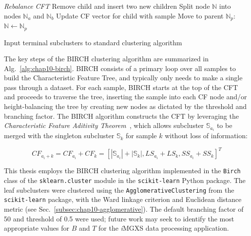 \begin{algorithm}[h!]
\begin{algorithmic}[1]
    \item[]

    \Statex \hspace{0.2in} \textit{Rebalance CFT}
        \State Remove child and insert two new children
          \State Split node $\mathbb{N}$ into nodes $\mathbb{N}_{a}$ and $\mathbb{N}_{b}$
        \EndIf
      \Else
        \State Update CF vector for child with sample         
      \EndIf
	  \State Move to parent $\mathbb{N}_{p}$: $\mathbb{N} \leftarrow \mathbb{N}_{p}$
    \EndFor

  \item[]

  \EndFor

  \item[]

  \State Input terminal subclusters to standard clustering algorithm 
\end{algorithmic}
\end{algorithm}

The key steps of the BIRCH clustering algorithm are summarized in Alg.~\ref{alg:chap10-birch}. BIRCH consists of a primary loop over all samples to build the Characteristic Feature Tree, and typically only needs to make a single pass through a dataset. For each sample, BIRCH starts at the top of the CFT and proceeds to traverse the tree, inserting the sample into each CF node and/or height-balancing the tree by creating new nodes as dictated by the threshold and branching factor. The BIRCH algorithm constructs the CFT by leveraging the \textit{Characteristic Feature Aditivity Theorem}~\cite{zhang1996birch}, which allows subcluster $\mathbb{S}_{a_{i}}$ to be merged with the singleton subcluster $\mathbb{S}_{k}$ for sample $k$ without loss of information:

\begin{equation}
\label{eqn:chap10-birch-cf-additivity}
CF_{a_{i}+k} = CF_{a_{i}} + CF_{k} = \left[|\mathbb{S}_{a_{i}}| + |\mathbb{S}_{k}|, LS_{a_{i}} + LS_{k}, SS_{a_{i}} + SS_{k}\right]^{T}
\end{equation}

This thesis employs the BIRCH clustering algorithm implemented in the \texttt{Birch} class of the \texttt{sklearn.cluster} module in the \texttt{scikit-learn} Python package. The leaf subclusters were clustered using the \texttt{AgglomerativeClustering} from the \texttt{scikit-learn} package, with the Ward linkage criterion and Euclidean distance metric (see Sec.~\ref{subsec:chap10-agglomerative}). The default branching factor of 50 and threshold of 0.5 were used; future work may seek to identify the most appropriate values for $B$ and $T$ for the \textit{i}\ac{MGXS} data processing application.

